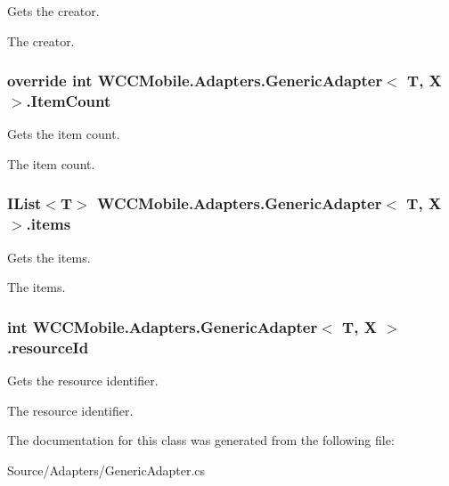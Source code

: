 Gets the creator. 

The creator. 
\subsubsection[{\texorpdfstring{Item\+Count}{ItemCount}}]{\setlength{\rightskip}{0pt plus 5cm}override int {\bf W\+C\+C\+Mobile.\+Adapters.\+Generic\+Adapter}$<$ T, X $>$.Item\+Count\hspace{0.3cm}{\ttfamily [get]}}\hypertarget{class_w_c_c_mobile_1_1_adapters_1_1_generic_adapter_a6d805fdca94bdf6d91bd4cad6998cb32}{}\label{class_w_c_c_mobile_1_1_adapters_1_1_generic_adapter_a6d805fdca94bdf6d91bd4cad6998cb32}


Gets the item count. 

The item count. 
\subsubsection[{\texorpdfstring{items}{items}}]{\setlength{\rightskip}{0pt plus 5cm}I\+List$<$T$>$ {\bf W\+C\+C\+Mobile.\+Adapters.\+Generic\+Adapter}$<$ T, X $>$.items\hspace{0.3cm}{\ttfamily [get]}}\hypertarget{class_w_c_c_mobile_1_1_adapters_1_1_generic_adapter_a7d82f417d14c6d0027dfb56cd3361c76}{}\label{class_w_c_c_mobile_1_1_adapters_1_1_generic_adapter_a7d82f417d14c6d0027dfb56cd3361c76}


Gets the items. 

The items. 
\subsubsection[{\texorpdfstring{resource\+Id}{resourceId}}]{\setlength{\rightskip}{0pt plus 5cm}int {\bf W\+C\+C\+Mobile.\+Adapters.\+Generic\+Adapter}$<$ T, X $>$.resource\+Id\hspace{0.3cm}{\ttfamily [get]}}\hypertarget{class_w_c_c_mobile_1_1_adapters_1_1_generic_adapter_a2adf5c93b6f5abaf8c51e28a9a91c6d3}{}\label{class_w_c_c_mobile_1_1_adapters_1_1_generic_adapter_a2adf5c93b6f5abaf8c51e28a9a91c6d3}


Gets the resource identifier. 

The resource identifier. 

The documentation for this class was generated from the following file\+:\begin{DoxyCompactItemize}
\item 
Source/\+Adapters/Generic\+Adapter.\+cs\end{DoxyCompactItemize}

